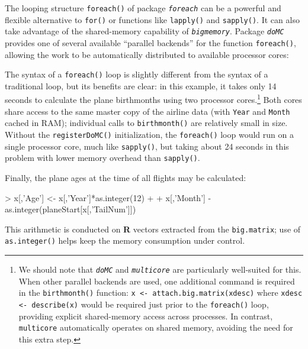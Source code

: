 \documentclass[12pt]{article}
\newcommand{\proglang}[1]{\textbf{#1}}
\newcommand{\pkg}[1]{\texttt{\textsl{#1}}}
\newcommand{\code}[1]{\texttt{#1}}
\begin{document}
The looping structure \texttt{foreach()} of package \pkg{foreach}
can be a powerful and flexible alternative to \texttt{for()} or
functions like
\texttt{lapply()} and \texttt{sapply()}.  It can also
take advantage of the shared-memory
capability of \pkg{bigmemory}.  Package \pkg{doMC} provides one of several
available ``parallel backends'' for the function \texttt{foreach()}, allowing
the work to be automatically distributed to available processor cores:
\begin{Schunk}
\end{Schunk}
The syntax of a \code{foreach()} loop is slightly different from the
syntax of  a traditional loop, but its benefits are clear:
in this example, it takes only 14 seconds
to calculate the plane birthmonths using two processor cores.\footnote{We
should note that \pkg{doMC} and \pkg{multicore} are particularly well-suited
for this.  When other parallel backends are used, one additional command is
required in the \code{birthmonth()} function: \code{x <- attach.big.matrix(xdesc)}
where \code{xdesc <- describe(x)} would be required just prior to the
\code{foreach()} loop, providing explicit shared-memory access across processes.
In contrast, \code{multicore} automatically operates on shared memory,
avoiding the need for this extra step.}
Both cores share access to the same master copy
of the airline data (with \texttt{Year} and \texttt{Month} cached in RAM);
individual calls to \texttt{birthmonth()} are relatively small in size.
Without the \texttt{registerDoMC()}
initialization, the \code{foreach()} loop would run on a single processor core, much
like \code{sapply()}, but taking about 24 seconds in this problem
with lower memory overhead than \code{sapply()}.

Finally, the plane ages at the time of all flights may be calculated:
\begin{Schunk}
\begin{Sinput}
> x[,'Age'] <- x[,'Year']*as.integer(12) +
+              x[,'Month'] - as.integer(planeStart[x[,'TailNum']])
\end{Sinput}
\end{Schunk}
This arithmetic is conducted on \proglang{R} vectors extracted from
the \code{big.matrix}; use of
\code{as.integer()} helps keep the memory consumption under control.
\end{document}
